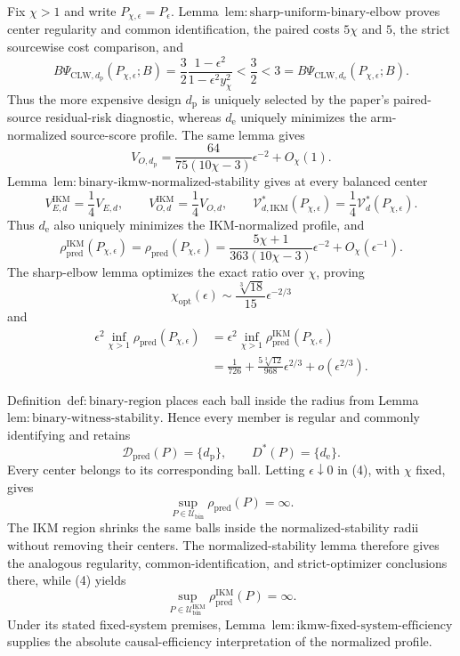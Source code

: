 Fix \(\chi>1\) and write \(P_{\chi,\epsilon}=P_\epsilon\).  Lemma~\(\mathrm{lem{:}sharp\text{-}uniform\text{-}binary\text{-}elbow}\) proves center regularity and common identification, the paired costs \(5\chi\) and \(5\), the strict sourcewise cost comparison, and
\[
 B\Psi_{\mathrm{CLW},d_{\mathrm p}}(P_{\chi,\epsilon};B)
 =\frac32\frac{1-\epsilon^2}{1-\epsilon^2y_\chi^2}
 <\frac32<3
 =B\Psi_{\mathrm{CLW},d_{\mathrm e}}(P_{\chi,\epsilon};B). \tag{1}
\]
Thus the more expensive design \(d_{\mathrm p}\) is uniquely selected by the paper's paired-source residual-risk diagnostic, whereas \(d_{\mathrm e}\) uniquely minimizes the arm-normalized source-score profile.  The same lemma gives
\[
 V_{O,d_{\mathrm p}}
 =\frac{64}{75(10\chi-3)}\epsilon^{-2}+O_\chi(1).         \tag{2}
\]
Lemma~\(\mathrm{lem{:}binary\text{-}ikmw\text{-}normalized\text{-}stability}\) gives at every balanced center
\[
 V_{E,d}^{\mathrm{IKM}}=\frac14V_{E,d},
 \qquad
 V_{O,d}^{\mathrm{IKM}}=\frac14V_{O,d},
 \qquad
 \mathcal V_{d,\mathrm{IKM}}^*(P_{\chi,\epsilon})
 =\frac14\mathcal V_d^*(P_{\chi,\epsilon}).              \tag{3}
\]
Thus \(d_{\mathrm e}\) also uniquely minimizes the IKM-normalized profile, and
\[
 \rho_{\mathrm{pred}}^{\mathrm{IKM}}(P_{\chi,\epsilon})
 =\rho_{\mathrm{pred}}(P_{\chi,\epsilon})
 =\frac{5\chi+1}{363(10\chi-3)}\epsilon^{-2}
 +O_\chi(\epsilon^{-1}).                                 \tag{4}
\]
The sharp-elbow lemma optimizes the exact ratio over \(\chi\), proving
\[
 \chi_{\mathrm{opt}}(\epsilon)
 \sim\frac{\sqrt[3]{18}}{15}\epsilon^{-2/3}
\]
and
\[
\begin{aligned}
 \epsilon^2\inf_{\chi>1}\rho_{\mathrm{pred}}(P_{\chi,\epsilon})
 &=\epsilon^2\inf_{\chi>1}\rho_{\mathrm{pred}}^{\mathrm{IKM}}(P_{\chi,\epsilon})\\
 &=\frac1{726}+\frac{5\sqrt[3]{12}}{968}\epsilon^{2/3}
 +o(\epsilon^{2/3}).                                     \tag{5}
\end{aligned}
\]

Definition~\(\mathrm{def{:}binary\text{-}region}\) places each ball inside the radius from Lemma~\(\mathrm{lem{:}binary\text{-}witness\text{-}stability}\).  Hence every member is regular and commonly identifying and retains
\[
 \mathcal D_{\mathrm{pred}}(P)=\{d_{\mathrm p}\},
 \qquad
 D^*(P)=\{d_{\mathrm e}\}.
\]
Every center belongs to its corresponding ball.  Letting \(\epsilon\downarrow0\) in (4), with \(\chi\) fixed, gives
\[
 \sup_{P\in\mathcal U_{\mathrm{bin}}}\rho_{\mathrm{pred}}(P)=\infty. \tag{6}
\]
The IKM region shrinks the same balls inside the normalized-stability radii without removing their centers.  The normalized-stability lemma therefore gives the analogous regularity, common-identification, and strict-optimizer conclusions there, while (4) yields
\[
 \sup_{P\in\mathcal U_{\mathrm{bin}}^{\mathrm{IKM}}}
 \rho_{\mathrm{pred}}^{\mathrm{IKM}}(P)=\infty.           \tag{7}
\]
Under its stated fixed-system premises, Lemma~\(\mathrm{lem{:}ikmw\text{-}fixed\text{-}system\text{-}efficiency}\) supplies the absolute causal-efficiency interpretation of the normalized profile.

